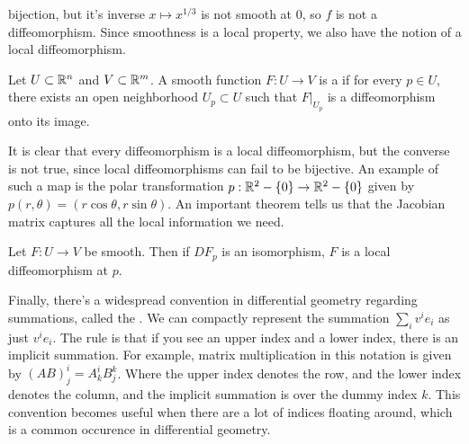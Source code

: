bijection, but it's inverse $x \mapsto x^{1/3}$ is not smooth at $0$, so
$f$ is not a diffeomorphism. Since smoothness is a local property, we
also have the notion of a local diffeomorphism.
%
\begin{defn}
	Let $U \subset \mathbb{R}^n$ and $V \subset \mathbb{R}^m$. A smooth function
	$F : U \to V$ is a  if for every $p \in U$,
	there exists an open neighborhood $U_p \subset U$ such that
	$F\vert_{U_p}$ is a diffeomorphism onto its image.
\end{defn}
%
It is clear that every diffeomorphism is a local diffeomorphism, but
the converse is not true, since local diffeomorphisms can fail to be
bijective. An example of such a map is the polar transformation
$p : \mathbb{R}^2-\left\lbrace 0 \right\rbrace \to \mathbb{R}^2-\left\lbrace 0 \right\rbrace$ given by
$p(r,\theta) = (r\cos\theta,r\sin\theta)$. An important theorem tells us
that the Jacobian matrix captures all the local information we need.
%
\begin{thm}
	Let $F : U \to V$ be smooth. Then if $DF_p$ is an isomorphism, $F$ is a
	local diffeomorphism at $p$.
\end{thm}
%
Finally, there's a widespread convention in differential geometry
regarding summations, called the . We
can compactly represent the summation $\sum_i v^ie_i$ as just $v^ie_i$.
The rule is that if you see an upper index and a lower index, there is
an implicit summation. For example, matrix multiplication in this
notation is given by $(AB)^i_j = A^i_kB^k_j$. Where the upper index denotes
the row, and the lower index denotes the column, and the implicit
summation is over the dummy index $k$. This convention becomes
useful when there are a lot of indices floating around, which is
a common occurence in differential geometry.
%
